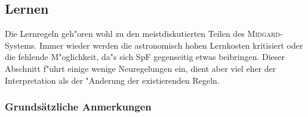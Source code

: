 \documentclass[10pt,a4paper,germanpar]{article}
\begin{document}
% 

\subsection{Lernen}

Die Lernregeln geh"oren wohl zu den meistdiskutierten Teilen des
\textsc{Midgard}-Systems. Immer wieder werden die astronomisch hohen
Lernkosten kritisiert oder die fehlende M"oglichkeit, da"s sich SpF
gegenseitig etwas beibringen. Dieser Abschnitt f"uhrt einige wenige
Neuregelungen ein, dient aber viel eher der Interpretation als der
"Anderung der existierenden Regeln.

\subsubsection{Grundsätzliche Anmerkungen}
\end{document}
